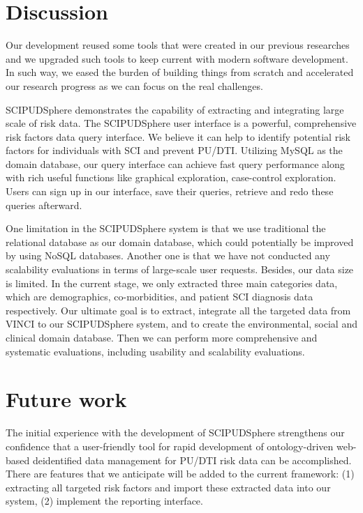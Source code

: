 \documentclass{amia}
\begin{document}
\section{Discussion}
Our development reused some tools that were created in our previous researches and we upgraded such tools to keep current with modern software development. In such way, we eased the burden of building things from scratch and accelerated our research progress as we can focus on the real challenges. 

SCIPUDSphere demonstrates the capability of extracting and integrating large scale of risk data. The SCIPUDSphere user interface is a powerful, comprehensive risk factors data query interface. We believe it can help to identify potential risk factors for individuals with SCI and prevent PU/DTI. Utilizing MySQL as the domain database, our query interface can achieve fast query performance along with rich useful functions like graphical exploration, case-control exploration. Users can sign up in our interface, save their queries, retrieve and redo these queries afterward. 

One limitation in the SCIPUDSphere system is that we use traditional the relational database as our domain database, which could potentially be improved by using NoSQL databases. Another one is that we have not conducted any scalability evaluations in terms of large-scale user requests. Besides, our data size is limited. In the current stage, we only extracted three main categories data, which are demographics, co-morbidities, and patient SCI diagnosis data respectively. Our ultimate goal is to extract, integrate all the targeted data from VINCI to our SCIPUDSphere system, and to create the environmental, social and clinical domain database. Then we can perform more comprehensive and systematic evaluations, including usability and scalability evaluations. 

\section{Future work}
The initial experience with the development of SCIPUDSphere strengthens our confidence that a user-friendly tool for rapid development of ontology-driven web-based deidentified data management for PU/DTI risk data can be accomplished. There are features that we anticipate will be added to the current framework: (1) extracting all targeted risk factors and import these extracted data into our system, (2) implement the reporting interface.
\end{document}
